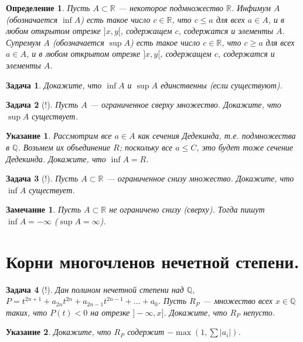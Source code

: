 \documentclass[12pt]{book}
\newcommand{\subs}{\section}
\def\R{{\mathbb R}}
\def\Q{{\mathbb Q}}
\theoremstyle{upshape}
\newtheorem{zadacha}{Задача}[chapter]
\theoremstyle{generic}
\newtheorem{opredelenie}[teorema]{Определение}
\theoremstyle{upshapenonumber}
\newtheorem{ukazanie}{Указание}[section]
\newtheorem{zamechanie}{Замечание}[chapter]
\newcommand{\следствие}{%
     \refstepcounter{teorema}
     {\noindent\bf Следствие \thechapter.\arabic{teorema}:\ }}
\newcommand{\пример}{%
     \refstepcounter{teorema}
     {\noindent\bf Пример \thechapter.\arabic{teorema}:\ }}
\newcommand{\лемма}{%
     \refstepcounter{teorema}
     {\noindent\bf Лемма \thechapter.\arabic{teorema}:\ }}
\newcommand{\теорема}{%
     \refstepcounter{teorema}
     {\noindent\bf Теорема \thechapter.\arabic{teorema}:\ }}
\newcommand{\утверждение}{%
     \refstepcounter{teorema}
     {\noindent\bf Утверждение \thechapter.\arabic{teorema}:\ }}
\begin{document}
\begin{opredelenie} Пусть $A\subset \R$ --- некоторое подмножество
$\R$. Инфимум $A$ (обозначается $\inf A$) есть такое число $c \in
\R$, что $c \leq a$ для всех $a\in A$, и в любом открытом отрезке
$]x, y[$, содержащем $c$, содержатся и элементы $A$. Супремум $A$
(обозначается $\sup A$) есть такое число $c \in \R$, что $c \geq a$
для всех $a\in A$, и в любом открытом отрезке $]x, y[$, содержащем
$c$, содержатся и элементы $A$.
\end{opredelenie}

\begin{zadacha} Докажите, что $\inf A$ и $\sup A$
единственны (если существуют).
\end{zadacha}

\begin{zadacha}[!] Пусть $A$ --- ограниченное сверху множество.
Докажите, что $\sup A$ существует.
\end{zadacha}

\begin{ukazanie} Рассмотрим все $a\in A$ как сечения Дедекинда,
т.е. подмножества в $\Q$. Возьмем их объединение $R$; поскольку все
$a \leq C$, это будет тоже сечение Дедекинда. Докажите, что $\inf A
= R$.
\end{ukazanie}

\begin{zadacha}[!] Пусть $A \subset \R$ --- ограниченное снизу множество.
Докажите, что $\inf A$ существует.
\end{zadacha}

\begin{zamechanie} Пусть $A\subset \R$ не ограничено снизу (сверху).
Тогда пишут $\inf A = -\infty$ ($\sup A = \infty$).
\end{zamechanie}



\subs{Корни многочленов нечетной степени.}

\begin{zadacha}[!] Дан полином нечетной степени над $\Q$,
$P= t^{2n+1} + a_{2n} t^{2n} + a_{2n-1} t^{2n-1} + ... + a_0$.
Пусть $R_P$ --- множество всех $x\in \Q$ таких, что $P(t)<0$ на
отрезке $]-\infty, x]$. Докажите, что $R_P$ непусто.
\end{zadacha}

\begin{ukazanie} Докажите, что $R_P$ содержит 
$-\max(1, \sum |a_i|)$.
\end{ukazanie}
\end{document}
